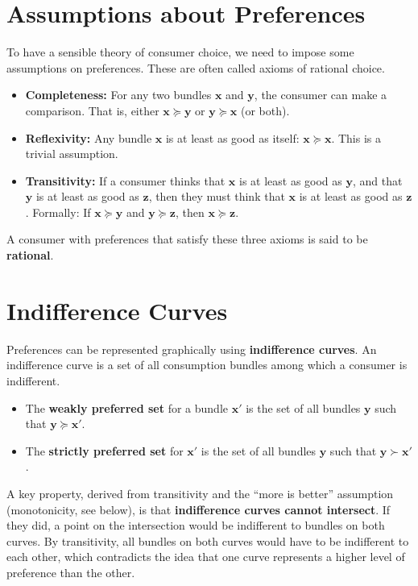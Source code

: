 \section{Assumptions about Preferences}
To have a sensible theory of consumer choice, we need to impose some assumptions on preferences. These are often called axioms of rational choice.
\begin{itemize}
    \item \textbf{Completeness:} For any two bundles $\mathbf{x}$ and $\mathbf{y}$, the consumer can make a comparison. That is, either $\mathbf{x} \succeq \mathbf{y}$ or $\mathbf{y} \succeq \mathbf{x}$ (or both).
    \item \textbf{Reflexivity:} Any bundle $\mathbf{x}$ is at least as good as itself: $\mathbf{x} \succeq \mathbf{x}$. This is a trivial assumption.
    \item \textbf{Transitivity:} If a consumer thinks that $\mathbf{x}$ is at least as good as $\mathbf{y}$, and that $\mathbf{y}$ is at least as good as $\mathbf{z}$, then they must think that $\mathbf{x}$ is at least as good as $\mathbf{z}$. Formally: If $\mathbf{x} \succeq \mathbf{y}$ and $\mathbf{y} \succeq \mathbf{z}$, then $\mathbf{x} \succeq \mathbf{z}$.
\end{itemize}
A consumer with preferences that satisfy these three axioms is said to be \textbf{rational}.

\section{Indifference Curves}
Preferences can be represented graphically using \textbf{indifference curves}. An indifference curve is a set of all consumption bundles among which a consumer is indifferent.
\begin{itemize}
    \item The \textbf{weakly preferred set} for a bundle $\mathbf{x}'$ is the set of all bundles $\mathbf{y}$ such that $\mathbf{y} \succeq \mathbf{x}'$.
    \item The \textbf{strictly preferred set} for $\mathbf{x}'$ is the set of all bundles $\mathbf{y}$ such that $\mathbf{y} \succ \mathbf{x}'$.
\end{itemize}
A key property, derived from transitivity and the ``more is better'' assumption (monotonicity, see below), is that \textbf{indifference curves cannot intersect}. If they did, a point on the intersection would be indifferent to bundles on both curves. By transitivity, all bundles on both curves would have to be indifferent to each other, which contradicts the idea that one curve represents a higher level of preference than the other.

